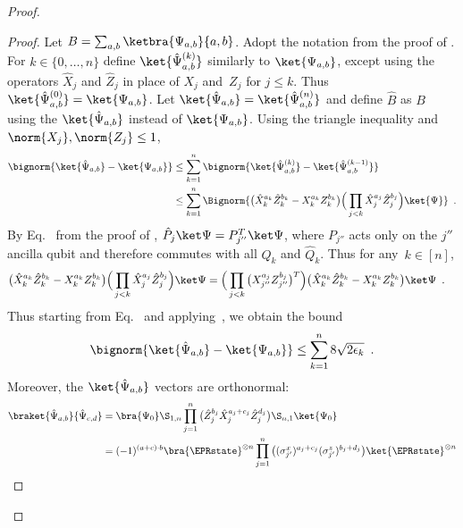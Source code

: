\documentclass[11pt]{article}
\begin{document}
\begin{proof}
\begin{proof}
Let $B = \sum_{a, b} \ketbra{\Psi_{a,b}}{a, b}$.  
Adopt the notation from the proof of .  
For $k \in \{0, \ldots, n\}$ define $\ket{\hat \Psi^{(k)}_{a,b}}$ similarly to $\ket{\Psi_{a,b}}$, except using the operators $\hat X_j$ and $\hat Z_j$ in place of $X_j$ and~$Z_j$ for $j \leq k$. Thus $\ket{\hat \Psi^{(0)}_{a,b}} = \ket{ \Psi_{a,b}}$.  Let $\ket{\hat \Psi_{a,b}} = \ket{ \hat \Psi^{(n)}_{a,b}}$ and define $\hat{B}$ as $B$ using the $\ket{\hat \Psi_{a,b}}$ instead of $\ket{\Psi_{a,b}}$.  Using the triangle inequality and $\norm{X_j}, \norm{Z_j} \leq 1$,
\begin{align}
\bignorm{ \ket{\hat \Psi_{a,b}} - \ket{\Psi_{a,b}} } 
&\leq \sum_{k=1}^n \bignorm{\ket{\hat \Psi^{(k)}_{a,b}} - \ket{\hat \Psi^{(k-1)}_{a,b}}} \notag\\
&\leq \sum_{k=1}^n \Bignorm{\big( \hat X_k^{a_k} \hat Z_k^{b_k} - X_k^{a_k} Z_k^{b_k} \big) \Big( \prod_{j < k} \hat X_j^{a_j} \hat Z_j^{b_j} \Big) \ket{\Psi}}
 \enspace . \label{e:normbound2a}
\end{align}
By Eq.~ from the proof of , $\hat P_j \ket \Psi = P_{j''}^T \ket \Psi$, where $P_{j''}$ acts only on the $j''$ ancilla qubit and therefore commutes with all $Q_k$ and $\hat Q_k$.  Thus for any~$k \in [n]$, 
\begin{align*}
\big( \hat X_k^{a_k} \hat Z_k^{b_k} - X_k^{a_k} Z_k^{b_k} \big) \Big( \prod_{j < k} \hat X_j^{a_j} \hat Z_j^{b_j} \Big)\ket \Psi
&=\Big( \prod_{j < k} \big(X_{j''}^{a_j} Z_{j''}^{b_j} \big)^T \Big) \big(\hat X_k^{a_k} \hat Z_k^{b_k} - X_k^{a_k} Z_k^{b_k} \big) \ket \Psi
 \enspace .
\end{align*}
Thus starting from Eq.~ and applying~, we obtain the bound
\begin{equation} \label{e:normbound2}
\bignorm{ \ket{\hat \Psi_{a,b}} - \ket{\Psi_{a,b}}} 
\leq \sum_{k=1}^n 8 \sqrt{2 \epsilon_k}
  \enspace .
\end{equation}
Moreover, the $\ket{\hat \Psi_{a,b}}$ vectors are orthonormal: 
\begin{align*}
\braket{\hat \Psi_{a,b}}{\hat \Psi_{c,d}}
&= \bra{\Psi_0} \S_{1,n} \prod_{j=1}^n \big( \hat Z_j^{b_j} \hat X_j^{a_j + c_j} \hat Z_j^{d_j} \big) \S_{n,1} \ket{\Psi_0} \\
&= (-1)^{(a + c) \cdot b} \bra{\EPRstate}^{\otimes n} \prod_{j=1}^n \big( (\sigma^x_{j'})^{a_j+c_j} (\sigma^z_{j'})^{b_j+d_j} \big) \ket{\EPRstate}^{\otimes n} \\

\end{align*}
\end{proof}
\end{proof}
\end{document}
